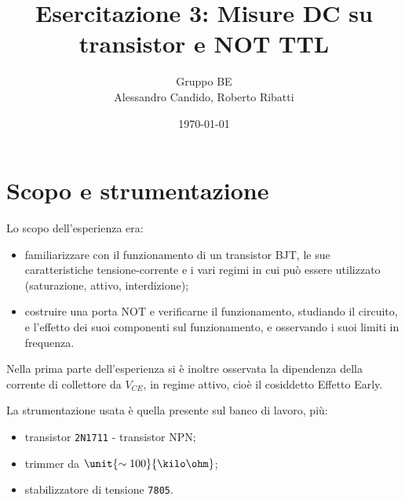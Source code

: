 \documentclass[10pt,a4paper]{article}
\title{Esercitazione 3: Misure DC su transistor e NOT TTL}
\author{Gruppo BE \\ Alessandro Candido, Roberto Ribatti}
\date{\today}
\def\code#1{\texttt{#1}}
\begin{document}
\maketitle

\section{Scopo e strumentazione}
Lo scopo dell'esperienza era:
\begin{itemize}
\item familiarizzare con il funzionamento di un transistor BJT, le sue caratteristiche tensione-corrente e i vari regimi in cui può essere utilizzato (saturazione, attivo, interdizione);
\item costruire una porta NOT e verificarne il funzionamento, studiando il circuito, e l'effetto dei suoi componenti sul funzionamento, e osservando i suoi limiti in frequenza.
\end{itemize}

Nella prima parte dell'esperienza si è inoltre osservata la dipendenza della corrente di collettore da $V_{CE}$, in regime attivo, cioè il cosiddetto Effetto Early.

La strumentazione usata è quella presente sul banco di lavoro, più:
\begin{itemize}
\item transistor \code{2N1711} - transistor NPN;
\item trimmer da $\unit{\sim 100}{\kilo\ohm}$;
\item stabilizzatore di tensione \code{7805}.
\end{itemize}
\end{document}
